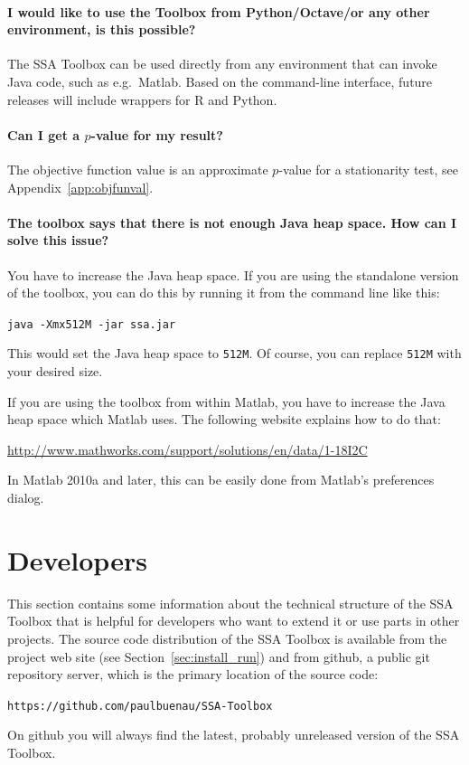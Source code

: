 \documentclass{article}
\newcommand{\1}{\ensuremath{\mathds{1}}}
\newcommand{\0}{\ensuremath{0}}
\begin{document}
\paragraph{I would like to use the Toolbox from Python/Octave/or any other environment, is this possible?} 
The SSA Toolbox can be used directly from any environment that can invoke Java code, such as 
e.g.~Matlab. Based on the command-line interface, future releases will include wrappers for R and Python. 

\paragraph{Can I get a $p$-value for my result?} The objective function value is an approximate
$p$-value for a stationarity test, see Appendix~\ref{app:objfunval}. 

\paragraph{The toolbox says that there is not enough Java heap space. How can I solve this issue?}
You have to increase the Java heap space. If you are using the standalone version of the toolbox, you can
do this by running it from the command line like this:
\begin{center}
\texttt{java -Xmx512M -jar ssa.jar}
\end{center}
This would set the Java heap space to \texttt{512M}. Of course, you can replace \texttt{512M} with your
desired size.

If you are using the toolbox from within Matlab, you have to increase the Java heap space which Matlab uses.
The following website explains how to do that:
\begin{center}
    \url{http://www.mathworks.com/support/solutions/en/data/1-18I2C}
\end{center}
In Matlab 2010a and later, this can be easily done from Matlab's preferences dialog.

\section{Developers}
\label{sec:dev}

This section contains some information about the technical structure of the SSA Toolbox
that is helpful for developers who want to extend it or use parts in other projects. The 
source code distribution of the SSA Toolbox is available from the project 
web site (see Section~\ref{sec:install_run}) and from github, a public git repository 
server, which is the primary location of the source code:
\begin{center}
	\texttt{https://github.com/paulbuenau/SSA-Toolbox}
\end{center}
On github you will always find the latest, probably unreleased version of the SSA Toolbox.
\end{document}
